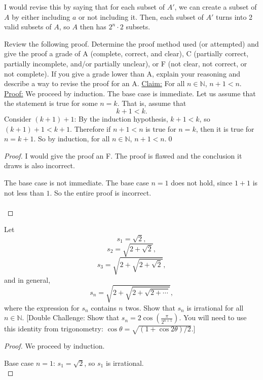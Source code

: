 \documentclass[12 pt]{exam}
\begin{document}
\begin{questions}
\begin{solution}
I would revise this by saying that for each subset of $A'$, we can create a subset of $A$ by either
including $a$ or not including it. Then, each subset of $A'$ turns into 2 valid subsets of $A$, so 
$A$ then has $2^n \cdot 2$ subsets.
\end{solution}


\question  Review the following proof. Determine the proof method used (or attempted) and give the proof a grade of A (complete, correct, and clear), C (partially correct, partially incomplete, and/or partially unclear), or F (not clear, not correct, or not complete). If you give a grade lower than A, explain your reasoning and describe a way to revise the proof for an A.  \underline{Claim:} For all $n\in\mathbb{N}$, $n+1 < n$.\\
\underline{Proof:} We proceed by induction. The base case is immediate. Let us assume that the statement is true for some $n=k$. That is, 
assume that
\[ k+1 < k.\]
Consider $(k+1)+1$: By the induction hypothesis, $k+1<k$, so $(k+1)+1<k+1$. Therefore if $n+1<n$ is true for $n=k$, then it is true
for $n=k+1$.  So by induction, for all $n\in\mathbb{N}$, $n+1<n$.\qed

\begin{solution}\begin{proof}
I would give the proof an F. The proof is flawed and the conclusion it draws is also incorrect.

The base case is not immediate. The base case $n=1$ does not hold, since $1+1$ is not less than $1$.
So the entire proof is incorrect.\\ \\
\end{proof}\end{solution}


\question Let
$$s_1 = \sqrt{2},$$
$$s_2 = \sqrt{2 + \sqrt{2}},$$
$$s_3 = \sqrt{2 + \sqrt{2 + \sqrt{2}}},$$
and in general,
$$s_n = \sqrt{2 + \sqrt{2 + \sqrt{2 + \cdots}}},$$
where the expression for $s_n$ contains $n$ twos. Show that $s_n$ is irrational for all $n \in \mathbb{N}$. [Double Challenge: Show that $s_n = 2\cos \left(\frac{\pi}{2^{n+1}} \right)$. You will need to use this identity from trigonometry: $\cos \theta = \sqrt{(1 + \cos 2 \theta)/2}.$]

\begin{solution}\begin{proof}
We proceed by induction.

Base case $n=1$: $s_1 = \sqrt{2}$, so $s_1$ is irrational. \\


\end{proof}
\end{solution}
\end{questions}
\end{document}

